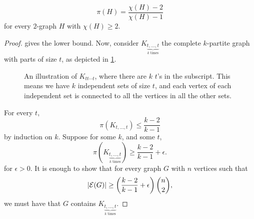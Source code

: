 \begin{theorem}
\[
\pi(H) = \frac{\chi(H)-2}{\chi(H)-1}
\]
for every $2$-graph $H$ with $\chi(H)\geq 2$.
\end{theorem}
\begin{proof}	
 gives the lower bound. Now, consider $K_{\underbrace{t,\dotsc,t}_{k \text{ times}}}$ the complete $k$-partite graph with parts of size $t$, as depicted in \cref{fig:Ktttt}.
\begin{figure}
\begin{center}
\end{center}
\caption{An illustration of $K_{tt\dotsm  t}$, where there are $k$ $t$'s in the subscript. This means we have $k$ independent sets of size $t$, and each vertex of each independent set is connected to all the vertices in all the other sets.  \label{fig:Ktttt}}
\end{figure}


For every $t$,
\[	
\pi(K_{t,\dotsc,t}) \leq \frac{k-2}{k-1}
\]
by induction on $k$. Suppose for some $k$, and some $t$,
\[	
\pi(K_{\underbrace{t,\dotsc,t}_{k \text{ times}}}) \geq \frac{k-2}{k-1} + \epsilon.
\]
for $\epsilon>0$. It is enough to show that for every graph $G$ with $n$ vertices such that
\[	
|\mathcal{E} (G)| \geq \left( \frac{k-2}{k-1}+ \epsilon \right) {n\choose 2},
\]
we must have that $G$ contains $K_{\underbrace{t,\dotsc,t}_{k \text{ times}}}$.


\end{proof}
